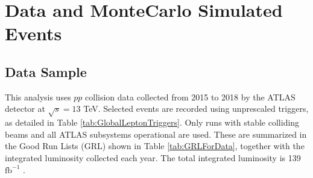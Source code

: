 \section{Data and MonteCarlo Simulated Events}
\label{sec:DataAndMC}

\subsection{Data Sample}
\label{subsec:DataSample}
This analysis uses $pp$ collision data collected from 2015 to 2018 by the ATLAS detector at $\sqrt{s}=13$ TeV. Selected events are recorded using unprescaled triggers, as detailed in Table \ref{tab:GlobalLeptonTriggers}. Only runs with stable colliding beams and all ATLAS subsystems operational are used. These are summarized in the Good Run Lists (GRL) shown in Table \ref{tab:GRLForData}, together with the integrated luminosity collected each year. The total integrated luminosity is 139 $\text{fb}^{-1}$ \cite{ATLAS-CONF-2019-021}.

\begin{table}[H]
  \centering
  \\
  \caption{Single-electron (a) and single-muon (b) trigger menus used depending on the year of data-taking.}
  \label{tab:GlobalLeptonTriggers}
\end{table}

